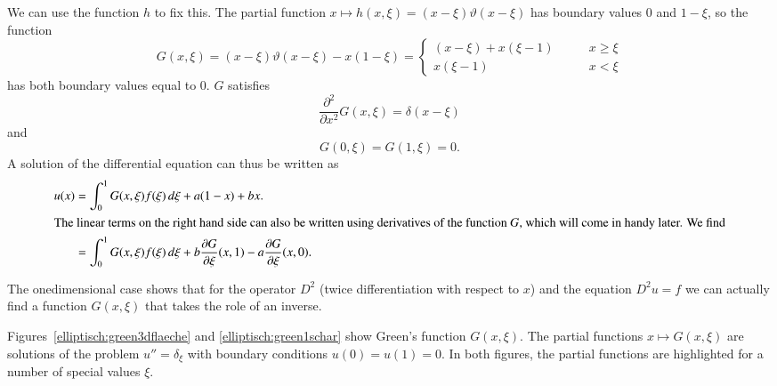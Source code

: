 We can use the function $h$ to fix this.
The partial function $x\mapsto h(x,\xi)=(x-\xi)\vartheta(x-\xi)$ has boundary
values $0$ and $1-\xi$, so the function
\[
G(x,\xi)
=
(x-\xi)\vartheta(x-\xi)-x(1-\xi)
=\begin{cases}
(x-\xi)+x(\xi-1)&\qquad x\ge \xi \\
x(\xi-1)&\qquad x<\xi
\end{cases}
\]
has both boundary values equal to $0$.
$G$ satisfies
\[
\frac{\partial^2}{\partial x^2}G(x,\xi)=\delta(x-\xi)
\]
and
\[
G(0,\xi)=G(1,\xi)=0.
\]
A solution of the differential equation can thus be written as
\begin{align}
u(x)
&=
\int_0^1G(x,\xi)f(\xi)\,d\xi+a(1-x)+bx.
\notag
\\
\intertext{The linear terms on the right hand side can also be written
using derivatives of the function $G$, which will come in handy later.
We find}
&=
\int_0^1G(x,\xi)f(\xi)\,d\xi
+b\frac{\partial G}{\partial\xi}(x,1)
-a\frac{\partial G}{\partial\xi}(x,0).
\label{elliptic:greendiff}
\end{align}

The onedimensional case shows that for the operator $D^2$ (twice
differentiation with respect to $x$) and the
equation $D^2u=f$
we can actually find a function $G(x,\xi)$ that takes the role 
of an inverse.

Figures~\ref{elliptisch:green3dflaeche} and \ref{elliptisch:green1schar}
show Green's function $G(x,\xi)$.
The partial functions 
$x\mapsto G(x,\xi)$ are solutions of the problem
$u''=\delta_\xi$ with boundary conditions $u(0)=u(1)=0$.
In both figures, the partial functions are highlighted for 
a number of special values $\xi$.

